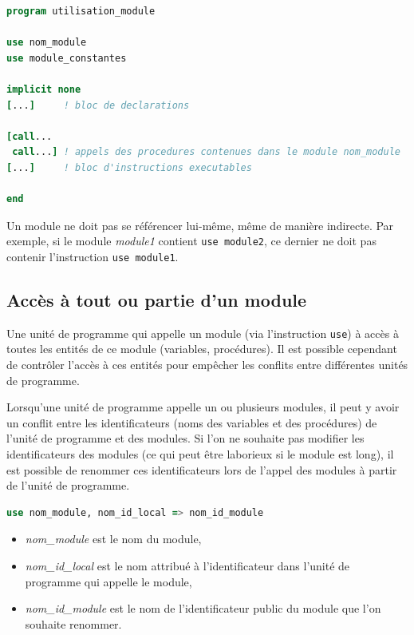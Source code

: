 \documentclass[a4paper,twoside]{article}
\begin{document}
\begin{lstlisting}[language=Fortran]
program utilisation_module

use nom_module 
use module_constantes

implicit none 
[...]     ! bloc de declarations

[call...
 call...] ! appels des procedures contenues dans le module nom_module
[...]     ! bloc d'instructions executables
 
end 
\end{lstlisting}

\begin{remarque}
Un module ne doit pas se référencer lui-même, même de manière indirecte. Par exemple, si le module \emph{module1} contient \texttt{use module2}, ce dernier ne doit pas contenir l'instruction \texttt{use module1}.
\end{remarque}

\subsection{Accès à tout ou partie d'un module}

Une unité de programme qui appelle un module (via l'instruction \texttt{use}) à accès à toutes les entités de ce module (variables, procédures). Il est possible cependant de contrôler l'accès à ces entités pour empêcher les conflits entre différentes unités de programme.

\bigskip

\begin{attention}
Lorsqu'une unité de programme appelle un ou plusieurs modules, il peut y avoir un conflit entre les identificateurs (noms des variables et des procédures) de l'unité de programme et des modules. Si l'on ne souhaite pas modifier les identificateurs des modules (ce qui peut être laborieux si le module est long), il est possible de renommer ces identificateurs lors de l'appel des modules à partir de l'unité de programme.
\begin{lstlisting}[language=Fortran]
use nom_module, nom_id_local => nom_id_module
\end{lstlisting}

\begin{itemize}
\item \emph{nom\_module} est le nom du module,
\item \emph{nom\_id\_local} est le nom attribué à l'identificateur 
dans l'unité de programme qui appelle le module,
\item \emph{nom\_id\_module} est le nom de l'identificateur public du 
module que l'on souhaite renommer.
\end{itemize}
\end{attention}
\end{document}
